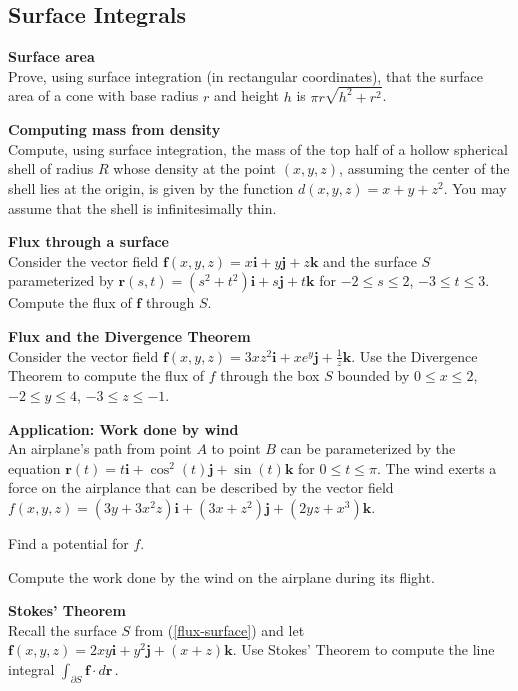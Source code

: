 \subsection{Surface Integrals}

\BEN

\item
\textbf{Surface area} \\
Prove, using surface integration (in rectangular coordinates), that the surface
area of a cone with base radius $r$ and height $h$ is $\pi r \sqrt{h^2 + r^2}$.

\item
\textbf{Computing mass from density} \\
Compute, using surface integration, the mass of the top half of a hollow
spherical shell of radius $R$ whose density at the point $(x,y,z)$, assuming
the center of the shell lies at the origin, is given by the function $d(x,y,z)
= x + y + z^2$. You may assume that the shell is infinitesimally thin.

\item \label{flux-surface}
\textbf{Flux through a surface} \\
Consider the vector field
$\mathbf{f}(x,y,z) = x\mathbf{i} + y\mathbf{j} + z\mathbf{k}$
and the surface $S$ parameterized by
$\mathbf{r}(s,t) = (s^2 + t^2)\mathbf{i} + s\mathbf{j} + t\mathbf{k}$
for $-2 \leq s \leq 2$, $-3 \leq t \leq 3$.  Compute the flux of $\mathbf{f}$
through $S$.

\item
\textbf{Flux and the Divergence Theorem} \\
Consider the vector field $\mathbf{f}(x,y,z) = 3xz^2\mathbf{i} +
xe^{y}\mathbf{j} + \frac{1}{z}\mathbf{k}$.  Use the Divergence Theorem to
compute the flux of $f$ through the box $S$ bounded by $0 \leq x \leq 2$, $-2
\leq y \leq 4$, $-3 \leq z \leq -1$.

\item
\textbf{Application: Work done by wind} \\
An airplane's path from point $A$ to point $B$ can be parameterized by the
equation $\mathbf{r}(t) = t\mathbf{i} + \cos^2(t)\mathbf{j} +
\sin(t)\mathbf{k}$ for $0 \leq t \leq \pi$.  The wind exerts a force on the
airplance that can be described by the vector field $f(x,y,z) = (3y +
3x^2z)\mathbf{i} + (3x + z^2)\mathbf{j} + (2yz + x^3)\mathbf{k}$.
\BEN
\item Find a potential for $f$.
\item Compute the work done by the wind on the airplane during its flight.
\EEN

\item
\textbf{Stokes' Theorem} \\
Recall the surface $S$ from (\ref{flux-surface}) and let $\mathbf{f}(x,y,z) =
2xy\mathbf{i} + y^2\mathbf{j} + (x+z)\mathbf{k}$.  Use Stokes' Theorem to
compute the line integral $\int_{\partial S} \! \mathbf{f} \cdot d\mathbf{r}
\,$.


\EEN

